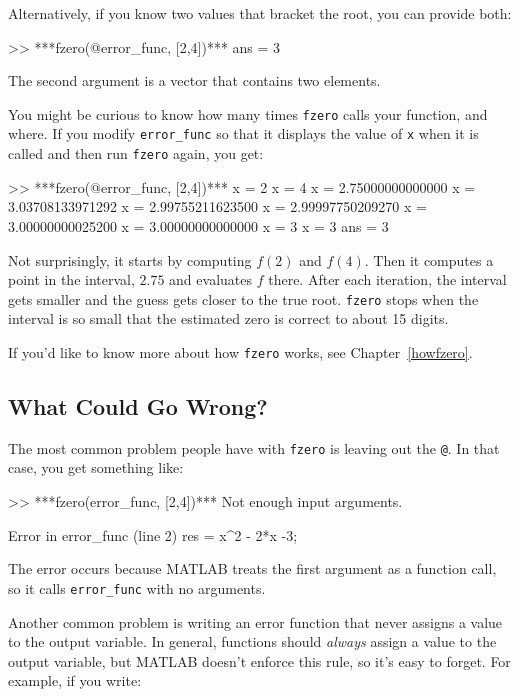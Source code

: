 Alternatively, if you know two values that bracket the root,
you can provide both:

\begin{code}
>> ***fzero(@error_func, [2,4])***
ans = 3
\end{code}

The second argument is a vector that contains two elements.  


You might be curious to know how many times {\tt fzero} calls your
function, and where.  If you modify \verb"error_func" so that it displays
the value of {\tt x} when it is called and then run {\tt fzero}
again, you get:

\begin{code}
>> ***fzero(@error_func, [2,4])***
x = 2
x = 4
x = 2.75000000000000
x = 3.03708133971292
x = 2.99755211623500
x = 2.99997750209270
x = 3.00000000025200
x = 3.00000000000000
x = 3
x = 3
ans = 3
\end{code}

Not surprisingly, it starts by computing $f(2)$ and $f(4)$.  Then it computes a point in the interval, $2.75$ and evaluates $f$ there.  After each iteration, the interval gets smaller and the guess gets closer to the true root.
{\tt fzero} stops when the interval is so small that the estimated
zero is correct to about 15 digits.
 
If you'd like to know more about how {\tt fzero} works, see Chapter~\ref{howfzero}.


\subsection{What Could Go Wrong?}

The most common problem people have with {\tt fzero} is leaving
out the {\tt @}.  In that case, you get something like:

\begin{code}
>> ***fzero(error_func, [2,4])***
Not enough input arguments.

Error in error_func (line 2)
    res = x^2 - 2*x -3;
\end{code}

The error occurs because MATLAB treats the first argument as a function call, so it calls \verb"error_func" with no arguments.


Another common problem is writing an error function that never
assigns a value to the output variable.  In general, functions should
{\em always} assign a value to the output variable, but MATLAB doesn't
enforce this rule, so it's easy to forget.  For example, if you
write:

